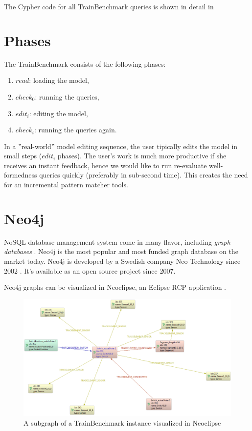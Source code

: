The Cypher code for all TrainBenchmark queries is shown in detail in%

\section{Phases}

The TrainBenchmark consists of the following phases:

\begin{enumerate}
  \item $\mathit{read}$: loading the model,
  \item $\mathit{check}_0$: running the queries,
  \item $\mathit{edit}_i$: editing the model, 
  \item $\mathit{check}_i$: running the queries again.
\end{enumerate}

In a ''real-world'' model editing sequence, the user tipically edits the model in small steps ($\mathit{edit}_i$ phases). The user's work is much more productive if she receives an instant feedback, hence we would like to run re-evaluate well-formedness queries quickly (preferably in sub-second time). This creates the need for an incremental pattern matcher tools.

\section{Neo4j}

NoSQL database management system come in many flavor, including \textit{graph databases} \cite{NoSQL}. Neo4j is the most popular and most funded graph database on the market today. Neo4j is developed by a Swedish company Neo Technology since 2002 \cite{neo4j}. It's available as an open source project since 2007.

Neo4j graphs can be visualized in Neoclipse, an Eclipse RCP application \cite{Neoclipse}.

\begin{figure}
\begin{center}
\includegraphics[width=14cm]{figures/neoclipse-graph}
\caption{A subgraph of a TrainBenchmark instance visualized in Neoclipse}
\label{fig:neoclipse}
\end{center}
\end{figure}

